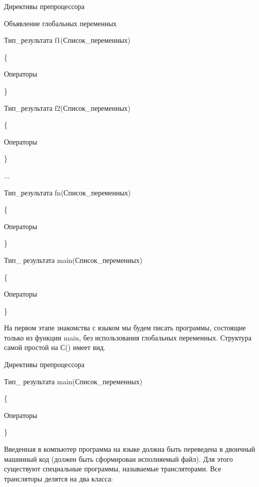 Директивы препроцессора

Объявление глобальных переменных

Тип\_результата f1(Список\_переменных)

\{

Операторы

\}

Тип\_результата f2(Список\_переменных)

\{

Операторы

\}

...

Тип\_результата fn(Список\_переменных)

\{

Операторы

\}

Тип\_ результата main(Список\_переменных)

\{

Операторы

\}

На первом этапе знакомства с языком мы будем писать программы, состоящие только из функции main, без использования
глобальных переменных. Структура самой  простой на С() имеет вид.

Директивы препроцессора

Тип\_ результата main(Список\_переменных)

\{

Операторы

\}

Введенная в компьютер программа на языке  должна быть переведена в двоичный машинный код (должен быть сформирован
исполняемый файл). Для этого существуют специальные программы, называемые трансляторами. Все
трансляторы  \textit{ }делятся на два класса:

